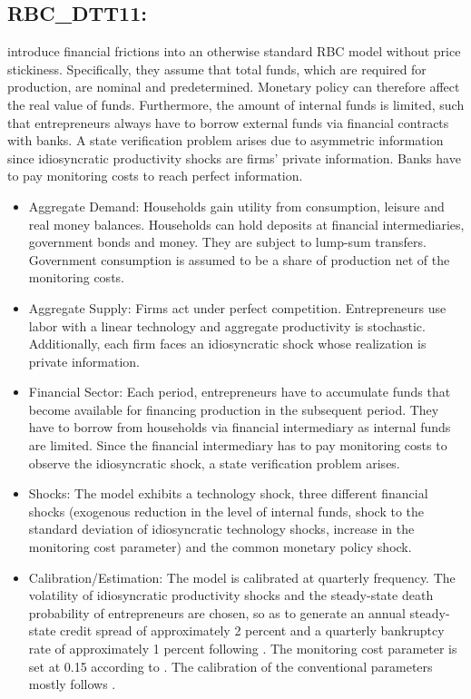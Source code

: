 \documentclass[11pt,a4paper]{article}
\begin{document}
	\subsection{RBC\_DTT11: \texorpdfstring{\cite{DeFioreetal2011}}{De Fiore et al. (2011)}}
	\label{RBCDTT11} 
	\cite{DeFioreetal2011} introduce financial frictions into an otherwise standard RBC model without price stickiness. Specifically, they assume that total funds, which are required for production, are nominal and predetermined. Monetary policy can therefore affect the real value of funds. Furthermore, the amount of internal funds is limited, such that entrepreneurs always have to borrow external funds via financial contracts with banks. A state verification problem arises due to asymmetric information since idiosyncratic productivity shocks are firms' private information. Banks have to pay monitoring costs to reach perfect information. 
	\begin{itemize}
		\item Aggregate Demand: Households gain utility from consumption, leisure and real
		money balances. Households can hold deposits at financial intermediaries, government bonds and money.
		They are subject to lump-sum transfers. Government consumption is assumed to
		be a share of production net of the monitoring costs.
		\item Aggregate Supply: Firms act under perfect competition. Entrepreneurs use labor
		with a linear technology and aggregate productivity is stochastic. Additionally, each
		firm faces an idiosyncratic shock whose realization is private information.
		\item Financial Sector: Each period, entrepreneurs have to accumulate funds that become
		available for financing production in the subsequent period. They have to borrow
		from households via financial intermediary as internal funds are limited. Since
		the financial intermediary has to pay monitoring costs to observe the idiosyncratic
		shock, a state verification problem arises.
		\item Shocks: The model exhibits a technology shock, three different financial shocks
		(exogenous reduction in the level of internal funds, shock to the standard deviation
		of idiosyncratic technology shocks, increase in the monitoring cost parameter) and
		the common monetary policy shock.
		\item Calibration/Estimation: The model is calibrated at quarterly frequency. The
		volatility of idiosyncratic productivity shocks and the steady-state death probability of entrepreneurs are chosen, so as to generate an annual steady-state credit
		spread of approximately 2 percent and a quarterly bankruptcy rate of approximately
		1 percent following \cite{CarlstromFuerst1997}. The monitoring cost parameter
		is set at 0.15 according to \cite{Levinetal2004}. The calibration of the conventional
		parameters mostly follows \cite{ChristianoEichenbaumEvans2005}.
	\end{itemize}
	
\end{document}
